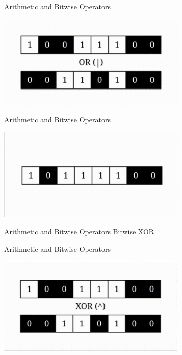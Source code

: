 \documentclass{beamer}
\begin{document}
    \begin{frame}{Arithmetic and Bitwise Operators}
        \begin{center}
            \includegraphics[scale = 0.8]{OR Before.png}
        \end{center}
    \end{frame}
    
    \begin{frame}{Arithmetic and Bitwise Operators}
        \begin{center}
            \includegraphics[scale = 0.8]{OR After.png}
        \end{center}
    \end{frame}
    

    \begin{frame}{Arithmetic and Bitwise Operators}
        \color{blue} \Large Bitwise  XOR\\
        \color{black} \normalsize \vskip 10pt
    \end{frame}
    
    \begin{frame}{Arithmetic and Bitwise Operators}
        \begin{center}
            \includegraphics[scale = 0.8]{XOR Before.png}
        \end{center}
    \end{frame}
    
\end{document}
